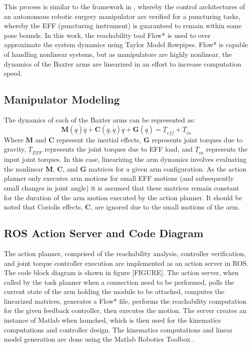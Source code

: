 This process is similar to the framework in \cite{6016596}, whereby the control architectures of an autonomous robotic surgery manipulator are verified for a puncturing tasks, whereby the EFF (puncturing instrument) is guaranteed to remain within some pose bounds.
In this work, the reachability tool Flow* \cite{Chen2013} is used to over approximate the system dynamics using Taylor Model flowpipes.
Flow* is capable of handling nonlinear systems, but as manipulators are highly nonlinear, the dynamics of the Baxter arms are linearized in an effort to increase computation speed. 


\subsection{Manipulator Modeling}
The dynamics of each of the Baxter arms can be represented as:
\begin{equation}
	\mathbf{M}(\underline{q})\ddot{\underline{q}} + \mathbf{C}(\underline{q},\underline{\dot{q}})\dot{\underline{q}} + \mathbf{G}(\underline{q}) = \underline{T}_{eff} + \underline{T}_{in}
\end{equation}
Where $\mathbf{M}$ and $\mathbf{C}$ represent the inertial effects, $\mathbf{G}$ represents joint torques due to gravity, $\underline{T}_{EFF}$ represents the joint torques due to EFF load, and $\underline{T}_{in}$ represents the input joint torques.
In this case, linearizing the arm dynamics involves evaluating the nonlinear $\mathbf{M}$, $\mathbf{C}$, and $\mathbf{G}$ matrices for a given arm configuration.
As the action planner only executes arm motions for small EFF motions (and subsequently small changes in joint angle) it is assumed that these matrices remain constant for the duration of the arm motion executed by the action planner.
It should be noted that Coriolis effects, $\mathbf{C}$, are ignored due to the small motions of the arm.


\subsection{ROS Action Server and Code Diagram}
The action planner, comprised of the reachability analysis, controller verification, and joint torque controller execution are implemented as an action server in ROS.
The code block diagram is shown in figure [FIGURE].
The action server, when called by the task planner when a connection need to be performed, polls the current state of the arm holding the module to be attached, computes the linearized matrices, generates a Flow* file, performs the reachability computation for the given feedback controller, then executes the motion.
The server creates an instance of Matlab when launched, which is then used for the kinematics computations and controller design.
The kinematics computations and linear model generation are done using the Matlab Robotics Toolbox \cite{Corke11a}.


